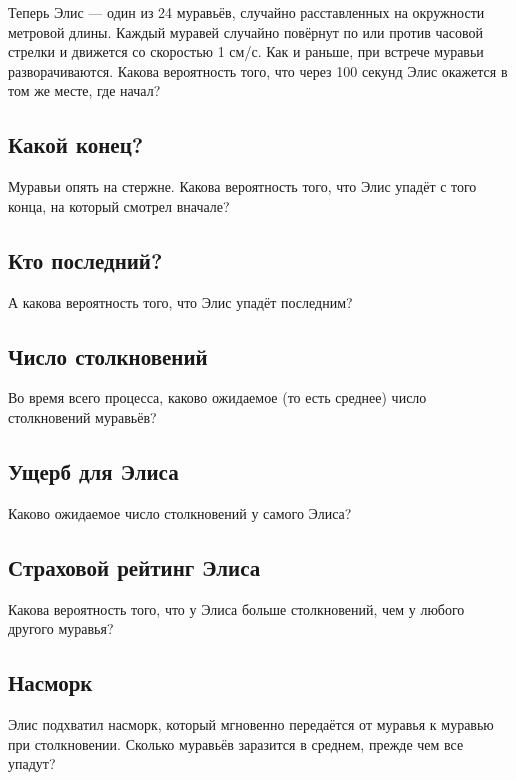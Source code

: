 Теперь Элис --- один из 24 муравьёв, случайно расставленных на окружности метровой длины.
Каждый муравей случайно повёрнут по или против часовой стрелки и движется со скоростью 1 см/с.
Как и раньше, при встрече муравьи разворачиваются.
Какова вероятность того, что через 100 секунд Элис окажется в том же месте, где начал?

\subsection*{Какой конец?}

Муравьи опять на стержне.
Какова вероятность того, что Элис упадёт с того конца, на который смотрел вначале?

\subsection*{Кто последний?}

А какова вероятность того, что Элис упадёт последним?

\subsection*{Число столкновений}

Во время всего процесса, каково ожидаемое (то есть среднее) число столкновений муравьёв?

\subsection*{Ущерб для Элиса}

Каково ожидаемое число столкновений у самого Элиса?

\subsection*{Страховой рейтинг Элиса}

Какова вероятность того, что у Элиса больше столкновений, чем у любого другого муравья?

\subsection*{Насморк}

Элис подхватил насморк, который мгновенно передаётся от муравья к муравью при столкновении. Сколько муравьёв заразится в среднем, прежде чем все упадут?

